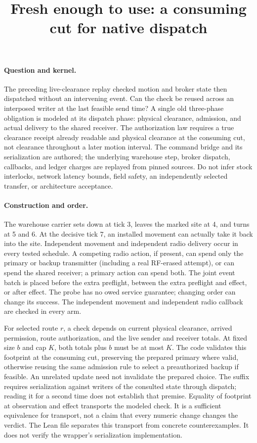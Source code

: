 \documentclass{article}
\title{Fresh enough to use: a consuming cut for native dispatch}
\begin{document}
\maketitle

\paragraph{Question and kernel.}
The preceding live-clearance replay checked motion and broker state then
dispatched without an intervening event. Can the check be reused across an
interposed writer at the last feasible send time? A single old three-phase
obligation is modeled at its dispatch phase: physical clearance, admission,
and actual delivery to the shared receiver. The authorization law requires
a true clearance receipt already readable and physical clearance at the
consuming cut, not clearance throughout a later motion interval. The command
bridge and its serialization are authored; the underlying warehouse step,
broker dispatch, callbacks, and ledger charges are replayed from pinned
sources. Do not infer stock interlocks, network latency bounds, field safety,
an independently selected transfer, or architecture acceptance.

\paragraph{Construction and order.}
The warehouse carrier sets down at tick 3, leaves the marked site at 4,
and turns at 5 and 6. At the decisive tick 7, an installed movement can
actually take it back into the site. Independent movement and independent
radio delivery occur in every tested schedule. A competing radio action,
if present, can spend only the primary or backup transmitter (including a
real RF-erased attempt), or can spend the shared receiver; a primary action
can spend both. The joint event batch is placed before the extra preflight,
between the extra preflight and effect, or after effect. The probe has no
owed service guarantee; changing order can change its success. The
independent movement and independent radio callback are checked in every arm.

For selected route $r$, a check depends on current physical clearance, arrived
permission, route authorization, and the live sender and receiver totals.
At fixed size $b$ and cap $K$, both totals plus $b$ must be at most $K$.
The code validates this footprint at the consuming cut, preserving the
prepared primary where valid, otherwise reusing the same admission rule to
select a preauthorized backup if feasible. An unrelated update need not
invalidate the prepared choice. The suffix requires serialization against
writers of the consulted state through dispatch; reading it for a second
time does not establish that premise. Equality of footprint at observation
and effect transports the modeled check. It is a sufficient equivalence
for transport, not a claim that every numeric change changes the verdict.
The Lean file separates this transport from concrete counterexamples. It
does not verify the wrapper's serialization implementation.
\end{document}
